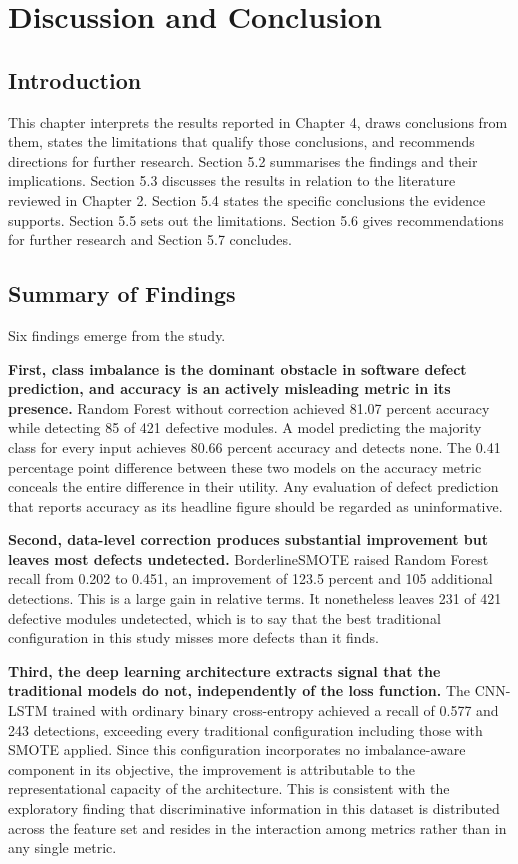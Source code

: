 \documentclass[12pt,a4paper,oneside]{report}
\begin{document}
\chapter{Discussion and Conclusion}

\section{Introduction}

This chapter interprets the results reported in Chapter 4, draws conclusions from them, states the limitations that qualify those conclusions, and recommends directions for further research. Section 5.2 summarises the findings and their implications. Section 5.3 discusses the results in relation to the literature reviewed in Chapter 2. Section 5.4 states the specific conclusions the evidence supports. Section 5.5 sets out the limitations. Section 5.6 gives recommendations for further research and Section 5.7 concludes.

\section{Summary of Findings}

Six findings emerge from the study.

\textbf{First, class imbalance is the dominant obstacle in software defect prediction, and accuracy is an actively misleading metric in its presence.} Random Forest without correction achieved 81.07 percent accuracy while detecting 85 of 421 defective modules. A model predicting the majority class for every input achieves 80.66 percent accuracy and detects none. The 0.41 percentage point difference between these two models on the accuracy metric conceals the entire difference in their utility. Any evaluation of defect prediction that reports accuracy as its headline figure should be regarded as uninformative.

\textbf{Second, data-level correction produces substantial improvement but leaves most defects undetected.} BorderlineSMOTE raised Random Forest recall from 0.202 to 0.451, an improvement of 123.5 percent and 105 additional detections. This is a large gain in relative terms. It nonetheless leaves 231 of 421 defective modules undetected, which is to say that the best traditional configuration in this study misses more defects than it finds.

\textbf{Third, the deep learning architecture extracts signal that the traditional models do not, independently of the loss function.} The CNN-LSTM trained with ordinary binary cross-entropy achieved a recall of 0.577 and 243 detections, exceeding every traditional configuration including those with SMOTE applied. Since this configuration incorporates no imbalance-aware component in its objective, the improvement is attributable to the representational capacity of the architecture. This is consistent with the exploratory finding that discriminative information in this dataset is distributed across the feature set and resides in the interaction among metrics rather than in any single metric.
\end{document}
